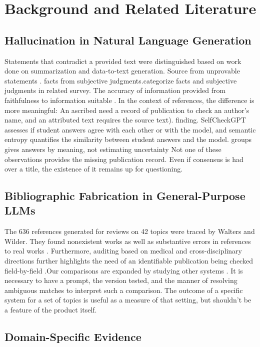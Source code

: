 \documentclass[acmsmall,screen,nonacm]{acmart}
\begin{document}
\section{Background and Related Literature}

\subsection{Hallucination in Natural Language Generation}

Statements that contradict a provided text were distinguished based on work done on summarization and data-to-text generation. Source from unprovable statements \cite{ref11}. facts from subjective judgments.categorize facts and subjective judgments in related survey. The accuracy of information provided from faithfulness to information suitable \cite{ref9}. In the context of references, the difference is more meaningful: An ascribed need a record of publication to check an author’s name, and an attributed text requires the source text). finding. SelfCheckGPT assesses if student answers agree with each other or with the model, and semantic entropy quantifies the similarity between student answers and the model. groups gives answers by meaning, not estimating uncertainty \cite{ref7,ref15} Not one of these observations provides the missing publication record. Even if consensus is had over a title, the existence of it remains up for questioning.

\subsection{Bibliographic Fabrication in General-Purpose LLMs}

The 636 references generated for reviews on 42 topics were traced by Walters and Wilder. They found nonexistent works as well as substantive errors in references to real works \cite{ref22}. Furthermore, auditing based on medical and cross-disciplinary directions further highlights the need of an identifiable publication being checked field-by-field \cite{ref2,ref4,ref17}.Our comparisons are expanded by studying other systems \cite{ref3,ref18}. It is necessary to have a prompt, the version tested, and the manner of resolving ambiguous matches to interpret such a comparison. The outcome of a specific system for a set of topics is useful as a measure of that setting, but shouldn’t be a feature of the product itself.

\subsection{Domain-Specific Evidence}
\end{document}
